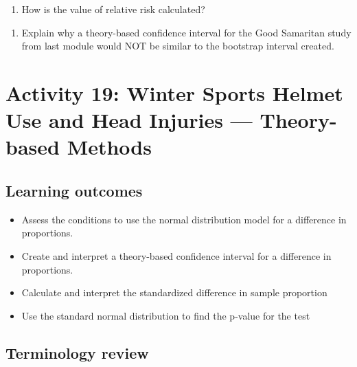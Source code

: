 \documentclass[
]{report}
\providecommand{\tightlist}{%
  \setlength{\itemsep}{0pt}\setlength{\parskip}{0pt}}
\begin{document}
\vspace{0.8in}

\begin{enumerate}
\def\labelenumi{\arabic{enumi}.}
\setcounter{enumi}{1}
\tightlist
\item
  How is the value of relative risk calculated?
\end{enumerate}

\vspace{0.2in}

\begin{enumerate}
\def\labelenumi{\arabic{enumi}.}
\setcounter{enumi}{2}
\tightlist
\item
  Explain why a theory-based confidence interval for the Good Samaritan study from last module would NOT be similar to the bootstrap interval created.
\end{enumerate}

\vspace{1in}

\newpage

\section{Activity 19: Winter Sports Helmet Use and Head Injuries --- Theory-based Methods}\label{activity-19-winter-sports-helmet-use-and-head-injuries-theory-based-methods}


\subsection{Learning outcomes}\label{learning-outcomes-20}

\begin{itemize}
\item
  Assess the conditions to use the normal distribution model for a difference in proportions.
\item
  Create and interpret a theory-based confidence interval for a difference in proportions.
\item
  Calculate and interpret the standardized difference in sample proportion
\item
  Use the standard normal distribution to find the p-value for the test
\end{itemize}

\subsection{Terminology review}\label{terminology-review-17}
\end{document}
